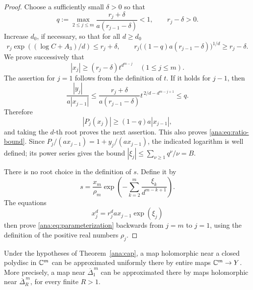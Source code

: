 \begin{proof}
Choose a sufficiently small \(\delta>0\) so that
\[
 q:=\max_{2\leq j\leq m}
       \frac{r_j+\delta}{a(r_{j-1}-\delta)}<1,
 \qquad r_j-\delta>0.
\]
Increase \(d_0\), if necessary, so that for all \(d\geq d_0\)
\[
 r_j\exp((\log C+A_3)/d)\leq r_j+\delta,\qquad
 r_j\bigl((1-q)a(r_{j-1}-\delta)\bigr)^{1/d}
       \geq r_j-\delta .
\]
We prove successively that
\[
 |x_j|\geq(r_j-\delta)t^{d^{m-j}}\quad(1\leq j\leq m).
\]
The assertion for \(j=1\) follows from the definition of \(t\).
If it holds for \(j-1\), then
\[
 \frac{|y_j|}{a|x_{j-1}|}
 \leq
 \frac{r_j+\delta}{a(r_{j-1}-\delta)}
 t^{\,2/d-d^{m-j+1}}\leq q.
\]
Therefore
\[
 |P_j(x_j)|\geq(1-q)a|x_{j-1}|,
\]
and taking the \(d\)-th root proves the next assertion.
This also proves \eqref{ana:eq:ratio-bound}.
Since \(P_j/(a x_{j-1})=1+y_j/(a x_{j-1})\), the indicated
logarithm is well defined; its power series gives the bound
\(|\xi_j|\leq\sum_{\nu\geq1}q^\nu/\nu=B\).

There is no root choice in the definition of \(s\).  Define it by
\[
 s=\frac{x_m}{\rho_m}
       \exp\left(-\sum_{k=2}^m\frac{\xi_k}{d^{m-k+1}}\right).
\]
The equations
\[
 x_j^d=r_j^d a x_{j-1}\exp(\xi_j)
\]
then prove \eqref{ana:eq:parameterization} backwards from \(j=m\)
to \(j=1\), using the definition of the positive real numbers
\(\rho_j\).
\end{proof}

\begin{proposition}\label{ana:polydisc}
Under the hypotheses of Theorem~\ref{ana:cap}, a map holomorphic near
a closed polydisc in \(\mathbb C^m\) can be approximated uniformly there by
entire maps \(\mathbb C^m\to Y\).  More precisely, a map near
\(\overline\Delta_1^{\,m}\) can be approximated there by maps
holomorphic near \(\overline\Delta_R^{\,m}\), for every finite
\(R>1\).
\end{proposition}

